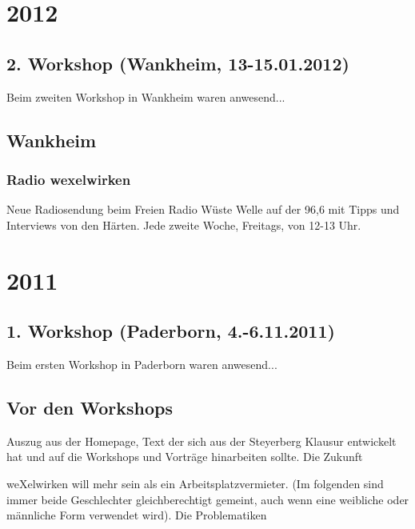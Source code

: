 \begin{appendix}
  \section{2012}
    \subsection{2. Workshop (Wankheim, 13-15.01.2012)}
Beim zweiten Workshop in Wankheim waren anwesend...
    \subsection{Wankheim}
      \subsubsection{Radio wexelwirken}
Neue Radiosendung beim Freien Radio Wüste Welle auf der 96,6 mit Tipps und Interviews von den Härten. Jede zweite Woche, Freitags, von 12-13 Uhr.
  \section{2011}
    \subsection{1. Workshop (Paderborn, 4.-6.11.2011)}
Beim ersten Workshop in Paderborn waren anwesend...
    \subsection{Vor den Workshops}
Auszug aus der Homepage, Text der sich aus der Steyerberg Klausur entwickelt hat und auf die Workshops und Vorträge hinarbeiten sollte.
\glqq 
Die Zukunft

weXelwirken will mehr sein als ein Arbeitsplatzvermieter. (Im folgenden sind immer beide Geschlechter gleichberechtigt gemeint, auch wenn eine weibliche oder männliche Form verwendet wird).
Die Problematiken


\end{appendix}
